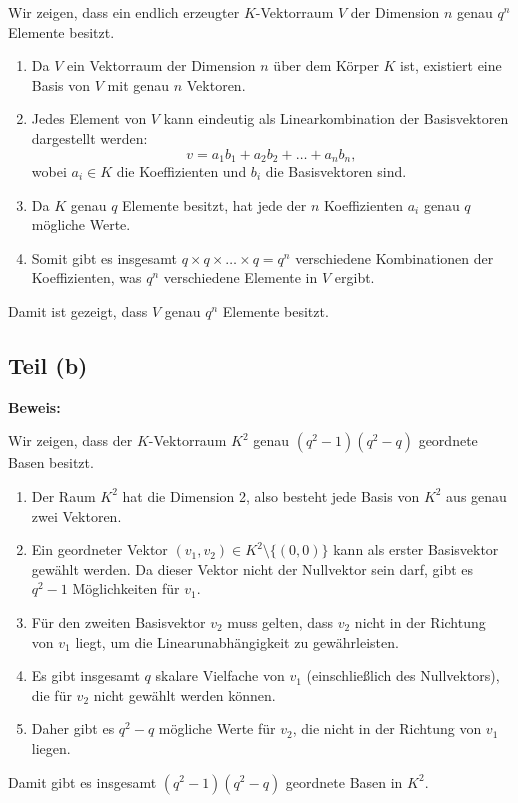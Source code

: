 \documentclass[11pt]{article}
\begin{document}
Wir zeigen, dass ein endlich erzeugter \( K \)-Vektorraum \( V \) der Dimension \( n \) genau \( q^n \) Elemente besitzt.

\begin{enumerate}
    \item Da \( V \) ein Vektorraum der Dimension \( n \) über dem Körper \( K \) ist, existiert eine Basis von \( V \) mit genau \( n \) Vektoren.
    \item Jedes Element von \( V \) kann eindeutig als Linearkombination der Basisvektoren dargestellt werden:
    \[
    v = a_1 b_1 + a_2 b_2 + \dots + a_n b_n,
    \]
    wobei \( a_i \in K \) die Koeffizienten und \( b_i \) die Basisvektoren sind.
    \item Da \( K \) genau \( q \) Elemente besitzt, hat jede der \( n \) Koeffizienten \( a_i \) genau \( q \) mögliche Werte.
    \item Somit gibt es insgesamt \( q \times q \times \dots \times q = q^n \) verschiedene Kombinationen der Koeffizienten, was \( q^n \) verschiedene Elemente in \( V \) ergibt.
\end{enumerate}
Damit ist gezeigt, dass \( V \) genau \( q^n \) Elemente besitzt.

\subsection*{Teil (b)}

\textbf{Beweis:}

Wir zeigen, dass der \( K \)-Vektorraum \( K^2 \) genau \( (q^2 - 1)(q^2 - q) \) geordnete Basen besitzt.

\begin{enumerate}
    \item Der Raum \( K^2 \) hat die Dimension 2, also besteht jede Basis von \( K^2 \) aus genau zwei Vektoren.
    \item Ein geordneter Vektor \( (v_1, v_2) \in K^2 \setminus \{(0, 0)\} \) kann als erster Basisvektor gewählt werden. Da dieser Vektor nicht der Nullvektor sein darf, gibt es \( q^2 - 1 \) Möglichkeiten für \( v_1 \).
    \item Für den zweiten Basisvektor \( v_2 \) muss gelten, dass \( v_2 \) nicht in der Richtung von \( v_1 \) liegt, um die Linearunabhängigkeit zu gewährleisten.
    \item Es gibt insgesamt \( q \) skalare Vielfache von \( v_1 \) (einschließlich des Nullvektors), die für \( v_2 \) nicht gewählt werden können.
    \item Daher gibt es \( q^2 - q \) mögliche Werte für \( v_2 \), die nicht in der Richtung von \( v_1 \) liegen.
\end{enumerate}
Damit gibt es insgesamt \( (q^2 - 1)(q^2 - q) \) geordnete Basen in \( K^2 \).




\end{document}
